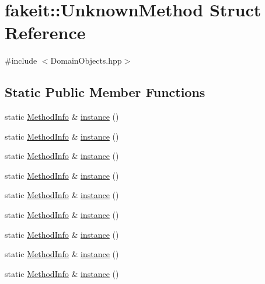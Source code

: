 \hypertarget{structfakeit_1_1UnknownMethod}{}\section{fakeit\+::Unknown\+Method Struct Reference}
\label{structfakeit_1_1UnknownMethod}


{\ttfamily \#include $<$Domain\+Objects.\+hpp$>$}

\subsection*{Static Public Member Functions}
\begin{DoxyCompactItemize}
\item 
static \mbox{\hyperlink{structfakeit_1_1MethodInfo}{Method\+Info}} \& \mbox{\hyperlink{structfakeit_1_1UnknownMethod_aa068385d4a46cc6121af1c90bc99117c}{instance}} ()
\item 
static \mbox{\hyperlink{structfakeit_1_1MethodInfo}{Method\+Info}} \& \mbox{\hyperlink{structfakeit_1_1UnknownMethod_aa068385d4a46cc6121af1c90bc99117c}{instance}} ()
\item 
static \mbox{\hyperlink{structfakeit_1_1MethodInfo}{Method\+Info}} \& \mbox{\hyperlink{structfakeit_1_1UnknownMethod_aa068385d4a46cc6121af1c90bc99117c}{instance}} ()
\item 
static \mbox{\hyperlink{structfakeit_1_1MethodInfo}{Method\+Info}} \& \mbox{\hyperlink{structfakeit_1_1UnknownMethod_aa068385d4a46cc6121af1c90bc99117c}{instance}} ()
\item 
static \mbox{\hyperlink{structfakeit_1_1MethodInfo}{Method\+Info}} \& \mbox{\hyperlink{structfakeit_1_1UnknownMethod_aa068385d4a46cc6121af1c90bc99117c}{instance}} ()
\item 
static \mbox{\hyperlink{structfakeit_1_1MethodInfo}{Method\+Info}} \& \mbox{\hyperlink{structfakeit_1_1UnknownMethod_aa068385d4a46cc6121af1c90bc99117c}{instance}} ()
\item 
static \mbox{\hyperlink{structfakeit_1_1MethodInfo}{Method\+Info}} \& \mbox{\hyperlink{structfakeit_1_1UnknownMethod_aa068385d4a46cc6121af1c90bc99117c}{instance}} ()
\item 
static \mbox{\hyperlink{structfakeit_1_1MethodInfo}{Method\+Info}} \& \mbox{\hyperlink{structfakeit_1_1UnknownMethod_aa068385d4a46cc6121af1c90bc99117c}{instance}} ()
\item 
static \mbox{\hyperlink{structfakeit_1_1MethodInfo}{Method\+Info}} \& \mbox{\hyperlink{structfakeit_1_1UnknownMethod_aa068385d4a46cc6121af1c90bc99117c}{instance}} ()
\end{DoxyCompactItemize}


